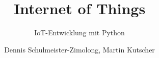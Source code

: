 \title{Internet of Things}
\subtitle{IoT-Entwicklung mit Python}
\author{Dennis Schulmeister-Zimolong, Martin Kutscher}

\renewcommand{\ubInstitute}{Studiengang Wirtschaftsinformatik}
\renewcommand{\ubModule}{IoT -- Technical Point of View}
\renewcommand{\ubType}{Aufgaben}
